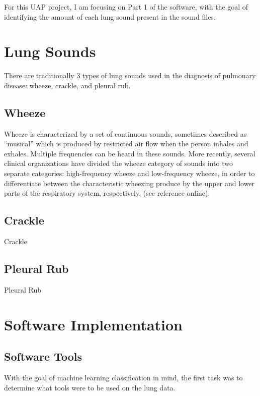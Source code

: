 \documentclass{article}
\begin{document}
  For this UAP project, I am focusing on Part 1 of the software, with the goal of identifying the amount of each lung sound present in the sound files.\\
  
\section{Lung Sounds}

There are traditionally 3 types of lung sounds used in the diagnosis of pulmonary disease: wheeze, crackle, and pleural rub. 

\subsection{Wheeze}

Wheeze is characterized by a set of continuous sounds, sometimes described as “musical” which is produced by restricted air flow when the person inhales and exhales.  Multiple frequencies can be heard in these sounds.  More recently, several clinical organizations have divided the wheeze category of sounds into two separate categories: high-frequency wheeze and low-frequency wheeze, in order to differentiate between the characteristic wheezing produce by the upper and lower parts of the respiratory system, respectively. (see reference online).

\subsection{Crackle}

Crackle

\subsection{Pleural Rub}

Pleural Rub

\section{Software Implementation}

\subsection{Software Tools}

 With the goal of machine learning classification in mind, the first task was to determine what tools were to be used on the lung data. \\
 
\end{document}
